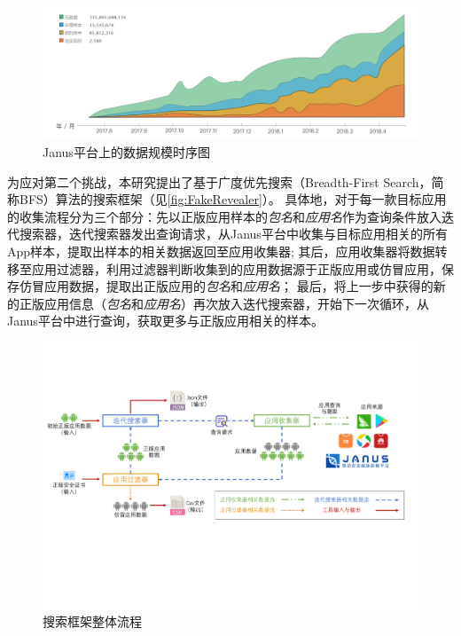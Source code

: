 \begin{figure}[htbp]
	\centering
	\includegraphics[width=\textwidth]{./Figures/edwin-Janus-data.png}
	\caption{Janus平台上的数据规模时序图}
	\label{fig:Janus-data}
	\vspace{-5mm}
\end{figure}


为应对第二个挑战，本研究提出了基于广度优先搜索（Breadth-First Search，简称BFS）算法的搜索框架（见\autoref{fig:FakeRevealer}）。
具体地，对于每一款目标应用的收集流程分为三个部分：先以正版应用样本的\emph{包名}和\emph{应用名}作为查询条件放入迭代搜索器，迭代搜索器发出查询请求，从Janus平台中收集与目标应用相关的所有App样本，提取出样本的相关数据返回至应用收集器;
其后，应用收集器将数据转移至应用过滤器，利用过滤器判断收集到的应用数据源于正版应用或仿冒应用，保存仿冒应用数据，提取出正版应用的\emph{包名}和\emph{应用名}；
最后，将上一步中获得的新的正版应用信息（\emph{包名}和\emph{应用名}）再次放入迭代搜索器，开始下一次循环，从Janus平台中进行查询，获取更多与正版应用相关的样本。

\begin{figure}[htbp]
	\centering
	\includegraphics[width=\textwidth]{./Figures/edwin-fakerevealer}
	\caption{搜索框架整体流程}
	\label{fig:FakeRevealer}
	\vspace{-3mm}
\end{figure}

